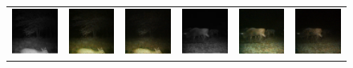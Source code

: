 \begin{figure}[htp!]
\begin{tabularx}{\textwidth}{Y Y Y !{\space} Y Y Y}
        \includegraphics{gfx/diffusion-sampling-loss-guided-vs-correction-guided-qual/nir_S2_B06_R1_PICT0387.jpg} & \includegraphics{gfx/diffusion-sampling-loss-guided-vs-correction-guided-qual/diffusion-correction-guided_S2_B06_R1_PICT0387.png} & \includegraphics{gfx/diffusion-sampling-loss-guided-vs-correction-guided-qual/diffusion-loss-guided_S2_B06_R1_PICT0387.png} & \includegraphics{gfx/diffusion-sampling-loss-guided-vs-correction-guided-qual/nir_S2_B06_R3_PICT1364.jpg} & \includegraphics{gfx/diffusion-sampling-loss-guided-vs-correction-guided-qual/diffusion-correction-guided_S2_B06_R3_PICT1364.png} & \includegraphics{gfx/diffusion-sampling-loss-guided-vs-correction-guided-qual/diffusion-loss-guided_S2_B06_R3_PICT1364.png} \\

\end{tabularx}
\end{figure}
